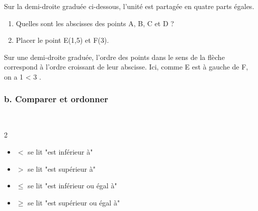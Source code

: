 \begin{Exemple}
Sur la demi-droite graduée ci-dessous, l'unité est partagée en quatre parts égales. 

\begin{center}

\end{center}
\begin{enumerate}
\item Quelles sont les abscisses des points A, B, C et D ?

\ligne

\ligne

\ligne

\item Placer le point E(1,5) et F(3). 
\end{enumerate}
\end{Exemple}
\vspace{-0.3cm}
\begin{Remarque}
Sur une demi-droite graduée, l'ordre des points dans le sens de la flèche correspond à l'ordre croissant de leur abscisse. Ici, comme E est à gauche de F, on a 1 < 3 .
\end{Remarque}



\subsubsection*{b. Comparer et ordonner}

\begin{Vocabulaire}[c]
$ $
\vspace{-1cm}
\begin{multicols}{2}
\begin{itemize}[label=\textcolor{Couleur7}{$\bullet$}]
\item $<$ se lit "est inférieur à"
\item $>$ se lit "est supérieur à"
\item $\leq$ se lit "est inférieur ou égal à"
\item $\geq$ se lit "est supérieur ou égal à"
\end{itemize}
\end{multicols}
\vspace{-0.5cm}
\end{Vocabulaire}

